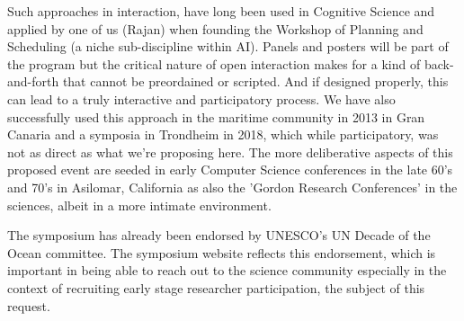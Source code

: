 \noindent
Such approaches in interaction, have long been used in Cognitive
Science and applied by one of us (Rajan) when founding the \nas
Workshop of Planning and Scheduling (a niche sub-discipline within
AI). Panels and posters will be part of the program but the critical
nature of open interaction makes for a kind of back-and-forth that
cannot be preordained or scripted. And if designed properly, this can
lead to a truly interactive and participatory process. We have also
successfully used this approach in the maritime community in 2013 in
Gran Canaria and a symposia in Trondheim in 2018, which while
participatory, was not as direct as what we're proposing here. The
more deliberative aspects of this proposed event are seeded in early
Computer Science conferences in the late 60's and 70's in Asilomar,
California as also the 'Gordon Research Conferences' in the sciences,
albeit in a more intimate environment.

The symposium has already been endorsed by UNESCO's UN Decade of the
Ocean committee. The symposium website reflects this endorsement,
which is important in being able to reach out to the science community
especially in the context of recruiting early stage researcher
participation, the subject of this request.

